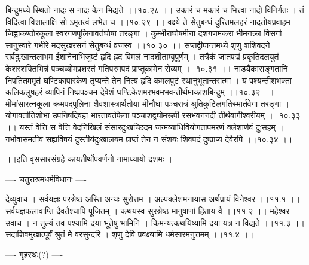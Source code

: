\documentclass[11pt]{book}
\begin{document}
\begin{landscape}
बिन्दुमध्ये स्थितो नादः स नादः केन भिद्यते ।।१०.२८ ।।
उकारं च मकारं च भित्त्वा नादो विनिर्गतः ।
तं विदित्वा विशालाक्षि सो ऽमृतत्वं लभेत च ।।१०.२९ ।।
वक्ष्ये ते सेतुबन्धं दुरितमलहरं नादतोयप्रवाहम
जिह्वाकण्ठोरकूला स्वरगणपुलिनावर्तघोषा तरङ्गा ।
कुम्भीराघोषमीना दशगणमकरा भीमनक्रा विसर्गा
सानुस्वारे गभीरे मदसुखरसनं सेतुबन्धं व्रजस्व ।।१०.३० ।।
सप्तद्वीपान्तमध्ये शृणु शशिवदने सर्वदुःखान्तलाभम
ईशानेनाभिजुष्टं हृदि ह्रद विमलं नादशीताम्बुपूर्णम् ।
तत्रैकं जातपद्मं प्रकृतिदलयुतं केशरशक्तिभिन्नं
पञ्चव्योमप्रशस्तं गतिपरमपदं प्राप्तुकामेन सेव्यम् ।।१०.३१ ।।
नाड्यैकासङ्गतानि निपतितममृतं घण्टिकापारकेण
तृप्यन्ते तेन नित्यं हृदि कमलपुटं स्थानुभूतान्तरात्मा ।
यं पश्यन्तीशभक्ता कलिकलुषहरं व्यापिनं निष्प्रपञ्चम
देवेशं घण्टिकेशमरभवमभवन्तीर्थमाकाशबिन्दुम् ।।१०.३२ ।।
मीमांसारत्नकूला क्रमपदपुलिना शैवशास्त्रार्थतोया
मीनौघा पञ्चरात्रं श्रुतिकुटिलगतिस्मार्तवेगा तरङ्गा ।
योगावर्तातिशोभा उपनिषदिवहा भारतावर्तफेना
पञ्चाशद्व्योमरूपी रसभवननदी तीर्थवागीश्वरीयम् ।।१०.३३ ।।
यस्तं वेत्ति स वेत्ति वेदनिखिलं संसारदुःखच्छिदम
जन्मव्याधिवियोगतापमरणं क्लेशार्णवं दुःसहम् ।
गर्भावासमतीव सह्यविषयं दुस्तीर्यदुःखालयम
प्राप्तं तेन न संशयः शिवपदं दुष्प्राप्य देवैरपि ।।१०.३४ ।।

 ।।इति वृससारसंग्रहे कायतीर्थोपवर्णनो नामाध्यायो दशमः ।।





---- चतुराश्रमधर्मविधानः ----

देव्युवाच ।
सर्वयज्ञः परश्रेष्ठ अस्ति अन्यः सुरोत्तम । 
अल्पक्लेशमनायास अर्थप्रायं विनेश्वर ।।११.१ ।।
सर्वयज्ञफलावाप्ति दैवतैश्चापि पूजितम् ।
कथयस्व सुरश्रेष्ठ मानुषाणां हिताय वै ।।११.२ ।।
महेश्वर उवाच ।
न तुल्यं तव पश्यामि दया भूतेषु भामिनि ।
किमन्यत्कथयिष्यामि दया यत्र न विद्यते ।।११.३ ।।
सदाशिवमुखात्पूर्वं श्रुतं मे वरसुन्दरि ।
शृणु देवि प्रवक्ष्यामि धर्मसारमनुत्तमम् ।।११.४ ।।

---- गृहस्थः(?) ----


\end{landscape}
\end{document}
